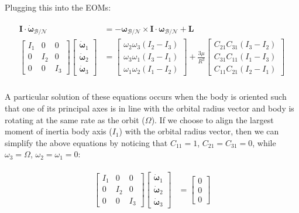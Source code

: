 \documentclass[
]{article}
\begin{document}
Plugging this into the EOMs:

\[\begin{aligned}
\begin{aligned}
    \boldsymbol{I} \cdot \dot{\boldsymbol{\omega}}_\mathcal{B/N} &= -\boldsymbol{\omega}_\mathcal{B/N} \times \boldsymbol{I} \cdot \boldsymbol{\omega}_\mathcal{B/N} + \boldsymbol{L} \\
    \begin{bmatrix} I_1 & 0 & 0 \\ 0 & I_2 & 0 \\ 0 & 0 & I_3 \end{bmatrix} \begin{bmatrix} \dot{\boldsymbol{\omega}}_1 \\ \dot{\boldsymbol{\omega}}_2 \\ \dot{\boldsymbol{\omega}}_3 \end{bmatrix} &= \begin{bmatrix} \omega_2 \omega_3 \left(I_2 - I_3\right) \\ \omega_3 \omega_1 \left(I_3 - I_1\right) \\ \omega_1 \omega_2 \left(I_1 - I_2\right) \end{bmatrix} + \frac{3\mu}{R^3} \begin{bmatrix} C_{21} C_{31} \left(I_3 - I_2\right) \\ C_{31} C_{11} \left(I_1 - I_3\right) \\ C_{11} C_{21} \left(I_2 - I_1\right) \end{bmatrix} \\
\end{aligned}
\end{aligned}\]

A particular solution of these equations occurs when the body is
oriented such that one of its principal axes is in line with the orbital
radius vector and body is rotating at the same rate as the orbit
(\(\Omega\)). If we choose to align the largest moment of inertia body
axis (\(I_1\)) with the orbital radius vector, then we can simplify the
above equations by noticing that \(C_{11} = 1\),
\(C_{21} = C_{31} = 0\), while \(\omega_3 = \Omega\),
\(\omega_2 = \omega_1 = 0\):

\[\begin{aligned}
\begin{aligned}
    \begin{bmatrix} I_1 & 0 & 0 \\ 0 & I_2 & 0 \\ 0 & 0 & I_3 \end{bmatrix} \begin{bmatrix} \dot{\boldsymbol{\omega}}_1 \\ \dot{\boldsymbol{\omega}}_2 \\ \dot{\boldsymbol{\omega}}_3 \end{bmatrix} &= \begin{bmatrix} 0 \\ 0 \\ 0 \end{bmatrix} 
\end{aligned}
\end{aligned}\]
\end{document}
